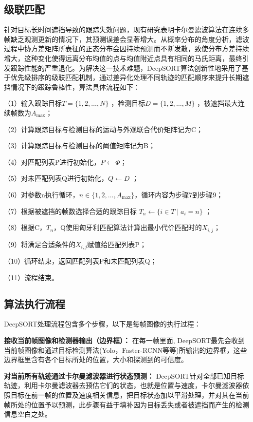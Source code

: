 \subsection{级联匹配}

针对目标长时间遮挡导致的跟踪失效问题，现有研究表明卡尔曼滤波算法在连续多帧缺乏观测更新的情况下，其预测误差会显著增大。从概率分布的角度分析，滤波过程中协方差矩阵所表征的正态分布会因持续预测而不断发散，致使分布方差持续增大，这种变化使得远离分布均值的点与均值附近点具有相同的马氏距离，最终引发跟踪性能的严重退化。为解决这一技术难题，DeepSORT算法创新性地采用了基于优先级排序的级联匹配机制，通过差异化处理不同轨迹的匹配顺序来提升长期遮挡情况下的跟踪鲁棒性，算法具体流程如下：

（1）输入跟踪目标\(T = \{1, 2, \ldots, N\}\)  ，检测目标\(D = \{1, 2, \ldots, M\}\)  ，被遮挡最大连续帧数为\(A_{\max}\)；

（2）计算跟踪目标与检测目标的运动与外观联合代价矩阵记为C； 

（3）计算跟踪目标与检测目标的阈值矩阵记为B；

（4）对匹配列表P进行初始化，\(P \leftarrow \varPhi\)； 

（5）对未匹配列表Q进行初始化，\(Q \leftarrow D\) ；

（6）对参数n执行循环，\(n \in \{1, 2, \ldots, A_{\max}\}\)，循环内容为步骤7到步骤9；

（7）根据被遮挡的帧数选择合适的跟踪目标 \(T_n \leftarrow \{i \in T \mid a_i = n\}\)  ；

（8）根据C，\(T_n\)，Q使用匈牙利匹配算法计算出最小代价匹配时的\(X_{i,j}\)； 

（9）将满足合适条件的\(X_{i,j}\)赋值给匹配列表P；

（10）循环结束，返回匹配列表P和未匹配列表Q；

（11）流程结束。

\subsection{算法执行流程}

DeepSORT处理流程包含多个步骤，以下是每帧图像的执行过程：

\textbf{接收当前帧图像和检测器输出（边界框）： }在每一帧里面, DeepSORT最先会收到当前帧图像和通过目标检测算法(Yolo，Faster-RCNN等等)所输出的边界框，这些边界框里含有各个目标所处的位置，大小和探测到的可信度。

\textbf{对当前所有轨迹通过卡尔曼滤波器进行状态预测： }DeepSORT针对全部已知目标轨迹，利用卡尔曼滤波器去预估它们的状态，也就是位置与速度，卡尔曼滤波器依照目标在前一帧的位置及速度相关信息，把目标状态加以平滑处理，并对其在当前帧所处的位置予以预测，此步骤有益于填补因为目标丢失或者被遮挡而产生的检测信息空白之处。

